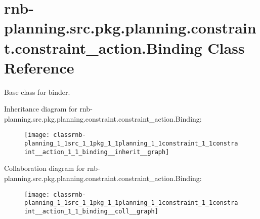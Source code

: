 \hypertarget{classrnb-planning_1_1src_1_1pkg_1_1planning_1_1constraint_1_1constraint__action_1_1_binding}{}\section{rnb-\/planning.src.\+pkg.\+planning.\+constraint.\+constraint\+\_\+action.\+Binding Class Reference}
\label{classrnb-planning_1_1src_1_1pkg_1_1planning_1_1constraint_1_1constraint__action_1_1_binding}


Base class for binder.  




Inheritance diagram for rnb-\/planning.src.\+pkg.\+planning.\+constraint.\+constraint\+\_\+action.\+Binding\+:\nopagebreak
\begin{figure}[H]
\begin{center}
\leavevmode
\texttt{[image: classrnb-planning\_1\_1src\_1\_1pkg\_1\_1planning\_1\_1constraint\_1\_1constraint\_\_action\_1\_1\_binding\_\_inherit\_\_graph]}
\end{center}
\end{figure}


Collaboration diagram for rnb-\/planning.src.\+pkg.\+planning.\+constraint.\+constraint\+\_\+action.\+Binding\+:\nopagebreak
\begin{figure}[H]
\begin{center}
\leavevmode
\texttt{[image: classrnb-planning\_1\_1src\_1\_1pkg\_1\_1planning\_1\_1constraint\_1\_1constraint\_\_action\_1\_1\_binding\_\_coll\_\_graph]}
\end{center}
\end{figure}
